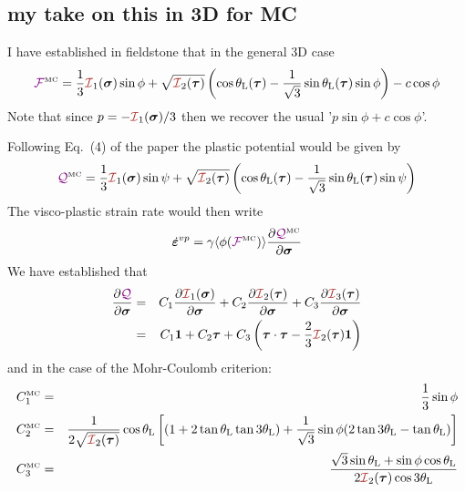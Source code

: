 \subsection{my take on this in 3D for MC}

I have established in fieldstone that in the general 3D case
\begin{equation}
\FFF^{\text{\tiny MC}}=\frac{1}{3} {\III}_1({\bm \sigma}) \sin \phi  + 
\sqrt{  {\III}_2({\bm \tau})  } \left( \cos \theta_{\rm L}(\bm\tau) - 
\frac{1}{\sqrt{3}} \sin \theta_{\rm L}(\bm\tau)  \sin \phi \right) - c \cos \phi
\end{equation}
Note that since $p=-{\III}_1(\bm\sigma)/3$ then we recover the usual '$p\sin\phi+c \cos\phi$'.

Following Eq.~(4) of the paper the plastic potential would be given by 
\[
\QQQ^{\text{\tiny MC}} 
=\frac{1}{3} {\III}_1({\bm \sigma}) \sin \psi  + 
\sqrt{  {\III}_2({\bm \tau})  } 
\left( \cos \theta_{\rm L}(\bm\tau) -\frac{1}{\sqrt{3}} \sin \theta_{\rm L}(\bm\tau) \sin \psi \right) 
\]
The visco-plastic strain rate would then write
\[
\dot{\bm\varepsilon}^{vp} = \gamma \langle \phi({\color{violet}\cal F}^{\text{\tiny MC}}) \rangle 
\frac{\partial {\color{violet}\cal Q}^{\text{\tiny MC}}}{\partial \bm\sigma}
\]
We have established that 
\begin{eqnarray}
\frac{\partial \QQQ}{\partial \bm\sigma}
&=& 
C_1  \frac{\partial {\III}_1(\bm\sigma)}{\partial \bm\sigma} 
+
C_2  \frac{\partial {\III}_2(\bm\tau)}{\partial \bm\sigma} 
+
C_3  \frac{\partial {\III}_3(\bm\tau)}{\partial \bm\sigma}\nn\\
&=& C_1 {\bm 1} + C_2  {\bm \tau} + C_3 \left( \bm\tau\cdot\bm\tau -\frac23 {\III}_2(\bm\tau){\bm 1} \right)
\end{eqnarray}
and in the case of the Mohr-Coulomb criterion:
\begin{eqnarray}
C_1^{\text{\tiny MC}} &=& \frac13 \sin\phi  \\ 
C_2^{\text{\tiny MC}} 
&=& 
\frac{1}{2 \sqrt{ {\III}_2(\bm\tau)}   }   
\cos \theta_{\rm L}
\left[
(1 +  2\tan \theta_{\rm L}   \tan 3\theta_{\rm L})
+\frac{1}{\sqrt{3}} \sin\phi
( 2\tan 3\theta_{\rm L} - \tan\theta_{\rm L})
\right]
\nn\\
C_3^{\text{\tiny MC}} 
&=& 
\frac{
\sqrt{3}\sin\theta_{\rm L}
+
 \sin \phi \cos \theta_{\rm L}
}{2 {\III}_2({\bm \tau}) \cos 3\theta_{\rm L}}
\end{eqnarray}



